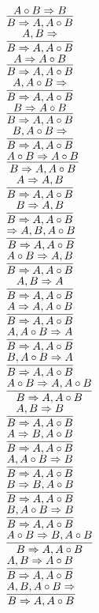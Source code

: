 \documentclass[11pt]{article}
\begin{document}
\begin{center}
\bigskip
\\$\infer{B\Rightarrow A, A\circ B}{A\circ B\Rightarrow B}$
\bigskip
\\$\infer{B\Rightarrow A, A\circ B}{A, B\Rightarrow }$
\bigskip
\\$\infer{B\Rightarrow A, A\circ B}{A\Rightarrow A\circ B}$
\bigskip
\\$\infer{B\Rightarrow A, A\circ B}{A, A\circ B\Rightarrow }$
\bigskip
\\$\infer{B\Rightarrow A, A\circ B}{B\Rightarrow A\circ B}$
\bigskip
\\$\infer{B\Rightarrow A, A\circ B}{B, A\circ B\Rightarrow }$
\bigskip
\\$\infer{B\Rightarrow A, A\circ B}{A\circ B\Rightarrow A\circ B}$
\bigskip
\\$\infer{B\Rightarrow A, A\circ B}{A\Rightarrow A, B}$
\bigskip
\\$\infer{B\Rightarrow A, A\circ B}{B\Rightarrow A, B}$
\bigskip
\\$\infer{B\Rightarrow A, A\circ B}{\Rightarrow A, B, A\circ B}$
\bigskip
\\$\infer{B\Rightarrow A, A\circ B}{A\circ B\Rightarrow A, B}$
\bigskip
\\$\infer{B\Rightarrow A, A\circ B}{A, B\Rightarrow A}$
\bigskip
\\$\infer{B\Rightarrow A, A\circ B}{A\Rightarrow A, A\circ B}$
\bigskip
\\$\infer{B\Rightarrow A, A\circ B}{A, A\circ B\Rightarrow A}$
\bigskip
\\$\infer{B\Rightarrow A, A\circ B}{B, A\circ B\Rightarrow A}$
\bigskip
\\$\infer{B\Rightarrow A, A\circ B}{A\circ B\Rightarrow A, A\circ B}$
\bigskip
\\$\infer{B\Rightarrow A, A\circ B}{A, B\Rightarrow B}$
\bigskip
\\$\infer{B\Rightarrow A, A\circ B}{A\Rightarrow B, A\circ B}$
\bigskip
\\$\infer{B\Rightarrow A, A\circ B}{A, A\circ B\Rightarrow B}$
\bigskip
\\$\infer{B\Rightarrow A, A\circ B}{B\Rightarrow B, A\circ B}$
\bigskip
\\$\infer{B\Rightarrow A, A\circ B}{B, A\circ B\Rightarrow B}$
\bigskip
\\$\infer{B\Rightarrow A, A\circ B}{A\circ B\Rightarrow B, A\circ B}$
\bigskip
\\$\infer{B\Rightarrow A, A\circ B}{A, B\Rightarrow A\circ B}$
\bigskip
\\$\infer{B\Rightarrow A, A\circ B}{A, B, A\circ B\Rightarrow }$

\end{center}
\end{document}
